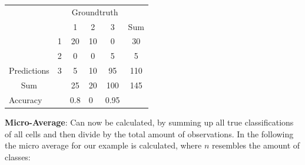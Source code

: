\documentclass[12pt,a4paper]{article}
\begin{document}
\begin{table}[h]
\begin{tabular}{cc|ccc|c}
\cline{3-5}
                                                    &                       & \multicolumn{3}{c|}{Groundtruth}                                                                                               &                          \\ \cline{3-6}
                                                    &                       & \multicolumn{1}{c|}{1}                          & \multicolumn{1}{c|}{2}                          & 3                          & \multicolumn{1}{c|}{Sum} \\ \hline
\multicolumn{1}{|c|}{}                              & 1                     & \multicolumn{1}{c|}{\cellcolor[HTML]{95C884}20} & \multicolumn{1}{c|}{\cellcolor[HTML]{E49696}10} & \cellcolor[HTML]{E49696}0  & \multicolumn{1}{c|}{30}  \\ \cline{2-6}
\multicolumn{1}{|c|}{}                              & 2                     & \multicolumn{1}{c|}{\cellcolor[HTML]{E49696}0}  & \multicolumn{1}{c|}{\cellcolor[HTML]{95C884}0}  & \cellcolor[HTML]{E49696}5  & \multicolumn{1}{c|}{5}   \\ \cline{2-6}
\multicolumn{1}{|c|}{\multirow{-3}{*}{Predictions}} & 3                     & \multicolumn{1}{c|}{\cellcolor[HTML]{E49696}5}  & \multicolumn{1}{c|}{\cellcolor[HTML]{E49696}10} & \cellcolor[HTML]{95C884}95 & \multicolumn{1}{c|}{110} \\ \hline
\multicolumn{1}{|c|}{Sum}                           &                       & \multicolumn{1}{c|}{25}                         & \multicolumn{1}{c|}{20}                         & 100                        & \multicolumn{1}{c|}{145}    \\ \hline
\multicolumn{1}{|l|}{Accuracy}                      & \multicolumn{1}{l|}{} & \multicolumn{1}{l|}{0.8}                         & \multicolumn{1}{l|}{0}                          & \multicolumn{1}{l|}{0.95}    & \multicolumn{1}{l|}{}    \\ \hline
\end{tabular}
\end{table}

\noindent \textbf{Micro-Average}: Can now be calculated, by summing up all true classifications of all cells and then divide by the total amount of observations. In the following the micro average for our example is calculated, where \(n\) resembles the amount of classes:
\end{document}
